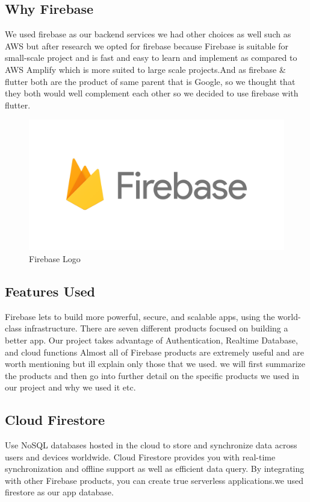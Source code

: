 \subsection{Why Firebase}
We used firebase as our backend services we had other choices as well such as AWS but after research we opted for firebase because Firebase is suitable for small-scale project and is fast and easy to learn and implement as compared to AWS Amplify which is more suited to large scale projects.And as firebase \& flutter both are the product of same parent that is Google, so we thought that they both would well complement each other so we decided to use firebase with flutter.
\begin{figure}[!htb]
    \centering
    \includegraphics[scale=0.25]{img/firebaselogo.png}
    \caption{Firebase Logo}
    \label{fig:Firebase}
\end{figure}

\subsection{Features Used}
Firebase lets to build more powerful, secure, and scalable apps, using the world-class infrastructure. There are seven different products focused on building a better app. Our project takes advantage of Authentication, Realtime Database, and cloud functions Almost all of Firebase products are extremely useful and are worth mentioning but ill explain only those that we used. we will first summarize the products and then go into further detail on the specific products we used in our project and why we used it etc.
\subsection{Cloud Firestore}
Use NoSQL databases hosted in the cloud to store and synchronize data across users and devices worldwide. Cloud Firestore provides you with real-time synchronization and offline support as well as efficient data query. By integrating with other Firebase products, you can create true serverless applications.we used firestore as our app database.

